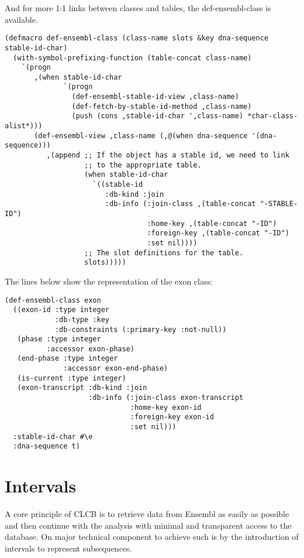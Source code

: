 \documentclass{book}
\newcommand\CLCB{CLCB }
\begin{document}
And for more 1:1 links between classes and tables, the def-ensembl-class is available.

\begin{lstlisting}
(defmacro def-ensembl-class (class-name slots &key dna-sequence stable-id-char)
  (with-symbol-prefixing-function (table-concat class-name)
    `(progn
       ,(when stable-id-char
              `(progn
                (def-ensembl-stable-id-view ,class-name)
                (def-fetch-by-stable-id-method ,class-name)
                (push (cons ,stable-id-char ',class-name) *char-class-alist*)))
       (def-ensembl-view ,class-name (,@(when dna-sequence '(dna-sequence)))
          ,(append ;; If the object has a stable id, we need to link
                   ;; to the appropriate table.
                   (when stable-id-char
                     `((stable-id
                        :db-kind :join
                        :db-info (:join-class ,(table-concat "-STABLE-ID")
                                  :home-key ,(table-concat "-ID")
                                  :foreign-key ,(table-concat "-ID")
                                  :set nil))))
                   ;; The slot definitions for the table.
                   slots)))))
\end{lstlisting}

The lines below show the representation of the exon class:
\begin{lstlisting}
(def-ensembl-class exon
  ((exon-id :type integer
            :db-type :key
            :db-constraints (:primary-key :not-null))
   (phase :type integer
          :accessor exon-phase)
   (end-phase :type integer
              :accessor exon-end-phase)
   (is-current :type integer)
   (exon-transcript :db-kind :join
                    :db-info (:join-class exon-transcript
                              :home-key exon-id
                              :foreign-key exon-id
                              :set nil)))
  :stable-id-char #\e
  :dna-sequence t)
\end{lstlisting}

\section{Intervals}

A core principle of \CLCB is to retrieve data from Ensembl as easily as
possible and then continue with the analysis with minimal and transparent
access to the database. On major technical component to achieve such is
by the introduction of intervals to represent subsequences.
\end{document}
